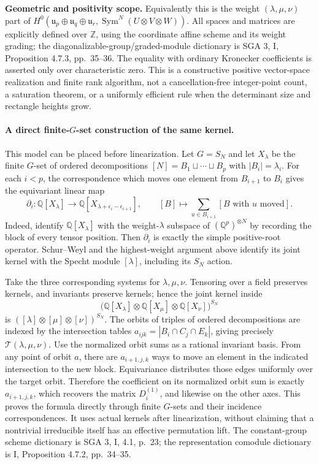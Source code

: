 \textbf{Geometric and positivity scope.} Equivalently this is the
weight $(\lambda,\mu,\nu)$ part of
$H^0(\mathfrak u_p\oplus\mathfrak u_q\oplus\mathfrak u_r,
\operatorname{Sym}^N(U\otimes V\otimes W))$.
All spaces and matrices are explicitly defined over $\mathbb Z$,
using the coordinate affine scheme and its weight grading; the
diagonalizable-group/graded-module dictionary is SGA 3, I,
Proposition 4.7.3, pp.~35--36. The equality with ordinary
Kronecker coefficients is asserted only over characteristic zero.
This is a constructive positive vector-space realization and
finite rank algorithm, not a cancellation-free integer-point
count, a saturation theorem, or a uniformly efficient rule when
the determinant size and rectangle heights grow.

\paragraph{A direct finite-$G$-set construction of the same kernel.}
This model can be placed before linearization. Let $G=S_N$ and
let $X_\lambda$ be the finite $G$-set of ordered decompositions
$[N]=B_1\sqcup\cdots\sqcup B_p$ with $|B_i|=\lambda_i$.
For each $i<p$, the correspondence which moves one element
from $B_{i+1}$ to $B_i$ gives the equivariant linear map
\[
 \partial_i:\mathbb Q[X_\lambda]\longrightarrow
                 \mathbb Q[X_{\lambda+\epsilon_i-\epsilon_{i+1}}],
 \qquad [B]\longmapsto
                 \sum_{u\in B_{i+1}}[B\text{ with }u\text{ moved}].
\]
Indeed, identify $\mathbb Q[X_\lambda]$ with the weight-$\lambda$
subspace of $(\mathbb Q^p)^{\otimes N}$ by recording the block
of every tensor position. Then $\partial_i$ is exactly the
simple positive-root operator. Schur--Weyl and the highest-weight
argument above identify its joint kernel with the Specht module
$[\lambda]$, including its $S_N$ action.

Take the three corresponding systems for $\lambda,\mu,\nu$.
Tensoring over a field preserves kernels, and invariants preserve
kernels; hence the joint kernel inside
\[
 \bigl(\mathbb Q[X_\lambda]\otimes\mathbb Q[X_\mu]
                     \otimes\mathbb Q[X_\nu]\bigr)^{S_N}
\]
is $([\lambda]\otimes[\mu]\otimes[\nu])^{S_N}$.
The orbits of triples of ordered decompositions are indexed by
the intersection tables
$a_{ijk}=|B_i\cap C_j\cap E_k|$, giving precisely
$\mathcal T(\lambda,\mu,\nu)$. Use the normalized orbit sums
as a rational invariant basis. From any point of orbit $a$,
there are $a_{i+1,j,k}$ ways to move an element in the indicated
intersection to the new block. Equivariance distributes those
edges uniformly over the target orbit. Therefore the coefficient
on its normalized orbit sum is exactly $a_{i+1,j,k}$, which
recovers the matrix $D_i^{(1)}$, and likewise on the other axes.
This proves the formula directly through finite $G$-sets and
their incidence correspondences. It uses actual kernels after
linearization, without claiming that a nontrivial irreducible
itself has an effective permutation lift. The constant-group
scheme dictionary is SGA 3, I, 4.1, p.~23; the representation
comodule dictionary is I, Proposition 4.7.2, pp.~34--35.

